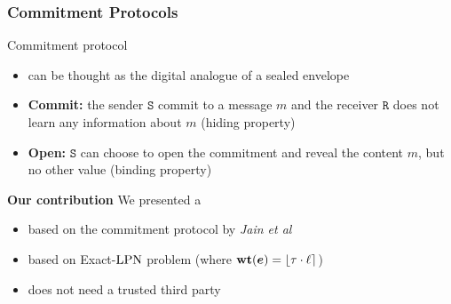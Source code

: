 \begin{frame}
\frametitle{Commitment Protocols}
\begin{block}{Commitment protocol}
 \begin{itemize}[<+->]
  \item can be thought as the digital analogue of a sealed envelope
  \item \textbf{Commit: } the sender $\mathtt{S}$ commit to a message $m$ and the receiver $\mathtt{R}$ does not learn any information about $m$ (\alert{hiding} property)
  \item \textbf{Open: } $\mathtt{S}$ can choose to open the commitment and reveal the content $m$, but no other value (\alert{binding} property)
 \end{itemize}
\end{block}

\begin{block}{\textbf{Our contribution}}
 We presented a {\color{red}{Commitment protocol}}
 \begin{itemize}[<+->]
  \item based on the commitment protocol by \textit{Jain et al}
  \item based on Exact-$\mathrm{LPN}$ problem (where $\mathbf{wt}(\boldsymbol{e})=\lfloor \tau \cdot \ell \rceil$)
  \item does not need a trusted third party
 \end{itemize}
\end{block}


\end{frame}



